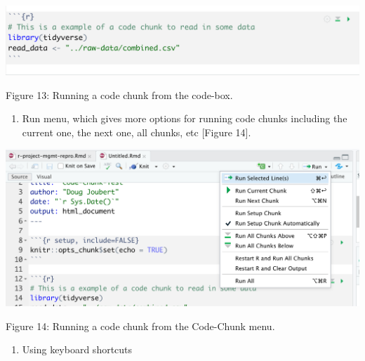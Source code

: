 \documentclass[
]{article}
\providecommand{\tightlist}{%
  \setlength{\itemsep}{0pt}\setlength{\parskip}{0pt}}
\begin{document}
\includegraphics[width=6.5in,height=\textheight]{images/code-chunk-run-01.png}

Figure 13: Running a code chunk from the code-box.

\begin{enumerate}
\def\labelenumi{\arabic{enumi}.}
\setcounter{enumi}{1}
\tightlist
\item
  Run menu, which gives more options for running code chunks including
  the current one, the next one, all chunks, etc {[}Figure 14{]}.
\end{enumerate}

\includegraphics[width=6.5in,height=\textheight]{images/code-run-chunk-02.png}

Figure 14: Running a code chunk from the Code-Chunk menu.

\begin{enumerate}
\def\labelenumi{\arabic{enumi}.}
\setcounter{enumi}{2}
\tightlist
\item
  Using keyboard shortcuts
\end{enumerate}
\end{document}

